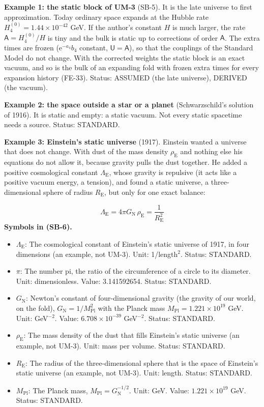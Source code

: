 \documentclass[
  10pt,
]{article}
\providecommand{\tightlist}{%
  \setlength{\itemsep}{0pt}\setlength{\parskip}{0pt}}
\begin{document}
\textbf{Example 1: the static block of UM-3} (SB-5). It is the late
universe to first approximation. Today ordinary space expands at the
Hubble rate \(H_4^{(0)} = 1.44\times10^{-42}\) GeV. If the author's
constant \(H\) is much larger, the rate \(\mathsf{A} = H_4^{(0)}/H\) is
tiny and the bulk is static up to corrections of order \(\mathsf{A}\).
The extra times are frozen (\(\mathrm{e}^{-a_4}b_4\) constant,
\(\mathsf{U} = \mathsf{A}\)), so that the couplings of the Standard
Model do not change. With the corrected weights the static block is an
exact vacuum, and so is the bulk of an expanding fold with frozen extra
times for every expansion history (FE-33). Status: ASSUMED (the late
universe), DERIVED (the vacuum).

\textbf{Example 2: the space outside a star or a planet}
(Schwarzschild's solution of 1916). It is static and empty: a static
vacuum. Not every static spacetime needs a source. Status: STANDARD.

\textbf{Example 3: Einstein's static universe} (1917). Einstein wanted a
universe that does not change. With dust of the mass density
\(\rho_{\mathrm{E}}\) and nothing else his equations do not allow it,
because gravity pulls the dust together. He added a positive
cosmological constant \(\Lambda_{\mathrm{E}}\), whose gravity is
repulsive (it acts like a positive vacuum energy, a tension), and found
a static universe, a three-dimensional sphere of radius
\(R_{\mathrm{E}}\), but only for one exact balance:

\[
\Lambda_{\mathrm{E}} = 4\pi G_{\mathrm{N}}\,\rho_{\mathrm{E}} = \frac{1}{R_{\mathrm{E}}^2} \tag{SB-6}
\] \textbf{Symbols in (SB-6).}

\begin{itemize}
\tightlist
\item
  \(\Lambda_{\mathrm{E}}\): The cosmological constant of Einstein's
  static universe of 1917, in four dimensions (an example, not UM-3).
  Unit: 1/length\(^2\). Status: STANDARD.
\item
  \(\pi\): The number pi, the ratio of the circumference of a circle to
  its diameter. Unit: dimensionless. Value: 3.141592654. Status:
  STANDARD.
\item
  \(G_{\mathrm{N}}\): Newton's constant of four-dimensional gravity (the
  gravity of our world, on the fold),
  \(G_{\mathrm{N}} = 1/M_{\mathrm{Pl}}^2\) with the Planck mass
  \(M_{\mathrm{Pl}} = 1.221\times10^{19}\) GeV. Unit: GeV\(^{-2}\).
  Value: \(6.708\times10^{-39}\) GeV\(^{-2}\). Status: STANDARD.
\item
  \(\rho_{\mathrm{E}}\): The mass density of the dust that fills
  Einstein's static universe (an example, not UM-3). Unit: mass per
  volume. Status: STANDARD.
\item
  \(R_{\mathrm{E}}\): The radius of the three-dimensional sphere that is
  the space of Einstein's static universe (an example, not UM-3). Unit:
  length. Status: STANDARD.
\item
  \(M_{\mathrm{Pl}}\): The Planck mass,
  \(M_{\mathrm{Pl}} = G_{\mathrm{N}}^{-1/2}\). Unit: GeV. Value:
  \(1.221\times10^{19}\) GeV. Status: STANDARD.
\end{itemize}
\end{document}
